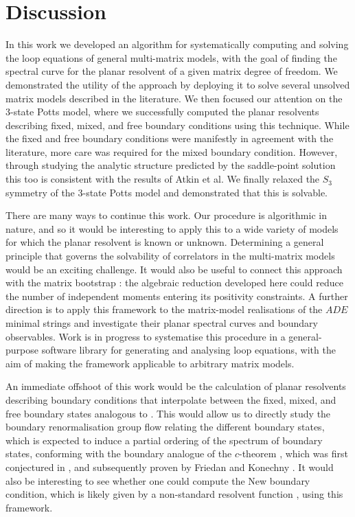\section{Discussion}

In this work we developed an algorithm for systematically computing and solving the loop equations
of general multi-matrix models, with the goal of finding the spectral curve for the planar
resolvent of a given matrix degree of freedom. We demonstrated the utility of the approach by deploying
it to solve several unsolved matrix models described in the literature. We then focused our
attention on the 3-state Potts model, where we successfully computed the planar resolvents
describing fixed, mixed, and free boundary conditions using this technique. While the fixed and
free boundary conditions were manifestly in agreement with the literature, more care was required
for the mixed boundary condition. However, through studying the analytic structure predicted by the
saddle-point solution this too is consistent with the results of Atkin et al. We finally relaxed
the $S_3$ symmetry of the 3-state Potts model and demonstrated that this is solvable.

There are many ways to continue this work. Our procedure is algorithmic in nature, and so it would
be interesting to apply this to a wide variety of models for which the planar resolvent is known or
unknown. Determining a general principle that governs the solvability of correlators in the
multi-matrix models would be an exciting challenge. It would also be useful to connect this
approach with the matrix bootstrap
\cite{Lin_2020,khalkhali2025bootstrappingcriticalbehaviormultimatrix}: the algebraic reduction
developed here could reduce the number of independent moments entering its positivity constraints.
A further direction is to apply this framework to the matrix-model realisations of the $ADE$
minimal strings \cite{Rodriguez:2025ade} and investigate their planar spectral curves and boundary
observables. Work is in progress to systematise this procedure in a general-purpose software library for
generating and analysing loop equations, with the aim of making the framework applicable to
arbitrary matrix models.

An immediate offshoot of this work would be the calculation of planar resolvents describing boundary
conditions that interpolate between the fixed, mixed, and free boundary states analogous to
\cite{Carroll:1997tr,Atkin:2012fx}. This would allow us to directly study the boundary
renormalisation group flow relating the different boundary states, which is expected to induce a
partial ordering of the spectrum of boundary states, conforming with the boundary analogue of the
$c$-theorem \cite{Zamolodchikov:1986gt}, which was first conjectured in \cite{Affleck:1991tk}, and
subsequently proven by Friedan and Konechny \cite{Friedan:2003yc}. It would also be interesting to
see whether one could compute the New boundary condition, which is likely given by a non-standard
resolvent function \cite{Kulanthaivelu:2019atg}, using this framework.

